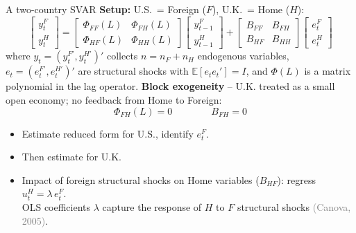 \documentclass[10pt]{beamer}
\begin{document}
\begin{frame}{A two-country SVAR}
\textbf{Setup:} U.S.\ = Foreign ($F$), U.K.\ = Home ($H$):
\begin{equation*}
\begin{bmatrix} y_t^F \\ y_t^H \end{bmatrix}
=
\begin{bmatrix} \Phi_{FF}(L) & \Phi_{FH}(L) \\ \Phi_{HF}(L) & \Phi_{HH}(L) \end{bmatrix}
\begin{bmatrix} y_{t-1}^F \\ y_{t-1}^H \end{bmatrix}
+
\begin{bmatrix} B_{FF} & B_{FH} \\ B_{HF} & B_{HH} \end{bmatrix}
\begin{bmatrix} e_t^F \\ e_t^H \end{bmatrix}
\end{equation*}
\scriptsize where $y_t = (y_t^{F\prime}, y_t^{H\prime})'$ collects $n = n_F + n_H$ endogenous variables, $e_t = (e_t^{F\prime}, e_t^{H\prime})'$ are structural shocks with $\mathbb{E}[e_t e_t']=I$, and $\Phi(L)$ is a matrix polynomial in the lag operator.
\normalsize
\vspace{0.4em}
\pause
\textbf{Block exogeneity} -- U.K. treated as a small open economy; no feedback from Home to Foreign:
\begin{equation*}
\Phi_{FH}(L) = 0 \qquad\qquad B_{FH} = 0
\end{equation*}
\vspace{-0.3em}
\begin{itemize}\scriptsize
    \item Estimate reduced form for U.S., identify $e_t^F$.
    \item Then estimate for U.K.
    \item Impact of foreign structural shocks on Home variables ($B_{HF}$): regress $u_t^H = \lambda\, e_t^F$. \\ OLS coefficients $\lambda$ capture the response of $H$ to $F$ structural shocks \textcolor{gray}{\scriptsize(Canova, 2005)}.
\end{itemize}
\end{frame}
\end{document}
